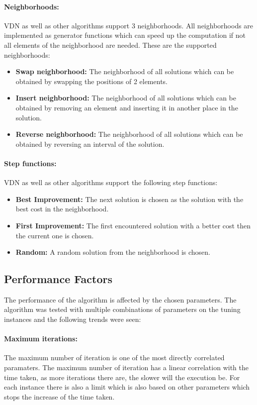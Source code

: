 \documentclass{article}
\begin{document}
\paragraph{Neighborhoods:}
VDN as well as other algorithms support 3 neighborhoods. All neighborhoods are implemented as generator functions which can speed up the computation if not all elements of the neighborhood are needed. These are the supported neighborhoods:
\begin{itemize}
	\item \textbf{Swap neighborhood:} The neighborhood of all solutions which can be obtained by swapping the positions of 2 elements.
	\item \textbf{Insert neighborhood:} The neighborhood of all solutions which can be obtained by removing an element and inserting it in another place in the solution.
	\item \textbf{Reverse neighborhood:} The neighborhood of all solutions which can be obtained by reversing an interval of the solution.
\end{itemize}

\paragraph{Step functions:}
VDN as well as other algorithms support the following step functions:
\begin{itemize}
	\item \textbf{Best Improvement:} The next solution is chosen as the solution with the best cost in the neighborhood.
	\item \textbf{First Improvement:} The first encountered solution with a better cost then the current one is chosen.
	\item \textbf{Random:} A random solution from the neighborhood is chosen.
\end{itemize}
\subsection*{Performance Factors}
The performance of the algorithm is affected by the chosen parameters. The algorithm was tested with multiple combinations of parameters on the tuning instances and the following trends were seen:

\paragraph{Maximum iterations:} 
The maximum number of iteration is one of the most directly correlated paramaters. The maximum number of iteration has a linear correlation with the time taken, as more iterations there are, the slower will the execution be. For each instance there is also a limit which is also based on other parameters which stops the increase of the time taken.
\end{document}
